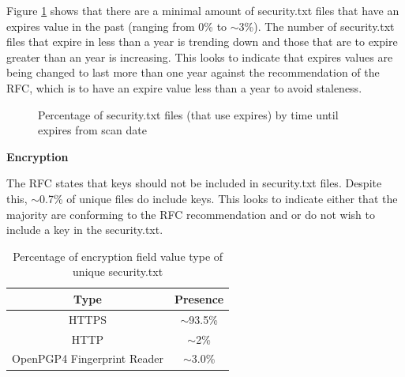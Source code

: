 \documentclass{mscreport}
\begin{document}
\noindent
Figure \ref{fig:security_txt_by_when_expires} shows that there are a minimal amount of security.txt files that have an expires value in the past (ranging from 0\% to $\sim$3\%). The number of security.txt files that expire in less than a year is trending down and those that are to expire greater than an year is increasing. This looks to indicate that expires values are being changed to last more than one year against the recommendation of the RFC, which is to have an expire value less than a year to avoid staleness.


\begin{figure}[t]
	\begin{center}
		\caption{Percentage of security.txt files (that use expires) by time until expires from scan date}
		\label{fig:security_txt_by_when_expires}
	\end{center}
\end{figure}

\vspace{0.7cm} \noindent
\textbf{Encryption}

\noindent
The RFC states that keys should not be included in security.txt files. Despite this, $\sim$0.7\% of unique files do include keys. This looks to indicate either that the majority are conforming to the RFC recommendation and or do not wish to include a key in the security.txt.

\begin{table}[H]
  \begin{center}
    \begin{tabular}{|c|c|}  %
      \hline
      \textbf{Type} & \textbf{Presence}\\
      \hline
      HTTPS & $\sim$93.5\%\\
      \hline
      HTTP & $\sim$2\%\\
      \hline
      OpenPGP4 Fingerprint Reader & $\sim$3.0\%\\
      \hline
    \end{tabular}
    \caption{Percentage of encryption field value type of unique security.txt}
    \label{table:security_txt_encryption_type} %
  \end{center}
\end{table}
\end{document}

